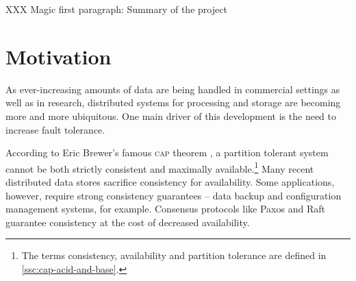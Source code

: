 \documentclass[11pt,chapterprefix=true,toc=bibliography,numbers=noendperiod,
               footnotes=multiple,twoside]{scrreprt}
\begin{document}
XXX Magic first paragraph: Summary of the project



\section{Motivation\label{sc:motivation}}

As ever-increasing amounts of data are being handled in commercial settings as well as in research, distributed systems for processing and storage are becoming more and more ubiquitous. One main driver of this development is the need to increase fault tolerance.

According to Eric Brewer's famous \textsc{cap} theorem \autocite{cap}, a partition tolerant system cannot be both strictly consistent and maximally available.\footnote{The terms consistency, availability and partition tolerance are defined in \autoref{ssc:cap-acid-and-base}.} Many recent distributed data stores sacrifice consistency for availability. Some applications, however, require strong consistency guarantees -- data backup and configuration management systems, for example. Consensus protocols like Paxos \autocite{paxos} and Raft \autocite{raft} guarantee consistency at the cost of decreased availability.
\end{document}

